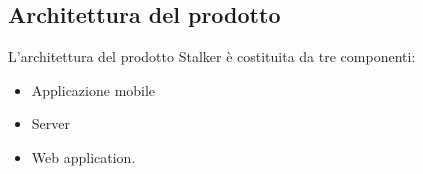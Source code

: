 \documentclass[../manuale-manutentore.tex]{subfiles}
\begin{document}
\subsection{Architettura del prodotto}%
\label{sub:architettura_del_prodotto}

L'architettura del prodotto Stalker è costituita da tre componenti:
\begin{itemize}
  \item Applicazione mobile
  \item Server
  \item Web application.
\end{itemize}






\end{document}
